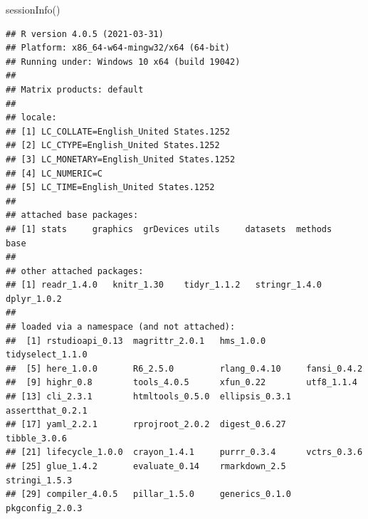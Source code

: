 \documentclass[
]{article}
\newenvironment{Shaded}{\begin{snugshade}}{\end{snugshade}}
\newcommand{\FunctionTok}[1]{\textcolor[rgb]{0.00,0.00,0.00}{#1}}
\newcommand{\NormalTok}[1]{#1}
\begin{document}
\begin{Shaded}
\begin{Highlighting}[]
\FunctionTok{sessionInfo}\NormalTok{()}
\end{Highlighting}
\end{Shaded}

\begin{verbatim}
## R version 4.0.5 (2021-03-31)
## Platform: x86_64-w64-mingw32/x64 (64-bit)
## Running under: Windows 10 x64 (build 19042)
## 
## Matrix products: default
## 
## locale:
## [1] LC_COLLATE=English_United States.1252 
## [2] LC_CTYPE=English_United States.1252   
## [3] LC_MONETARY=English_United States.1252
## [4] LC_NUMERIC=C                          
## [5] LC_TIME=English_United States.1252    
## 
## attached base packages:
## [1] stats     graphics  grDevices utils     datasets  methods   base     
## 
## other attached packages:
## [1] readr_1.4.0   knitr_1.30    tidyr_1.1.2   stringr_1.4.0 dplyr_1.0.2  
## 
## loaded via a namespace (and not attached):
##  [1] rstudioapi_0.13  magrittr_2.0.1   hms_1.0.0        tidyselect_1.1.0
##  [5] here_1.0.0       R6_2.5.0         rlang_0.4.10     fansi_0.4.2     
##  [9] highr_0.8        tools_4.0.5      xfun_0.22        utf8_1.1.4      
## [13] cli_2.3.1        htmltools_0.5.0  ellipsis_0.3.1   assertthat_0.2.1
## [17] yaml_2.2.1       rprojroot_2.0.2  digest_0.6.27    tibble_3.0.6    
## [21] lifecycle_1.0.0  crayon_1.4.1     purrr_0.3.4      vctrs_0.3.6     
## [25] glue_1.4.2       evaluate_0.14    rmarkdown_2.5    stringi_1.5.3   
## [29] compiler_4.0.5   pillar_1.5.0     generics_0.1.0   pkgconfig_2.0.3
\end{verbatim}
\end{document}
